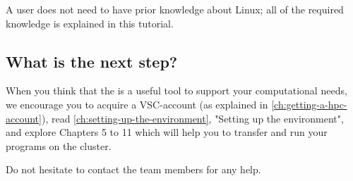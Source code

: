 A user does not need to have prior knowledge about Linux; all of the required
knowledge is explained in this tutorial.

\subsection{What is the next step?}
\label{sec:what-is-the-next-step}

When you think that the \hpc is a useful tool to support your computational
needs, we encourage you to acquire a VSC-account (as explained in
\autoref{ch:getting-a-hpc-account}), read \autoref{ch:setting-up-the-environment}, "Setting up the
environment", and explore Chapters 5 to 11 which will help you to transfer and
run your programs on the \hpc cluster.

Do not hesitate to contact the \HPC team members for any help.

